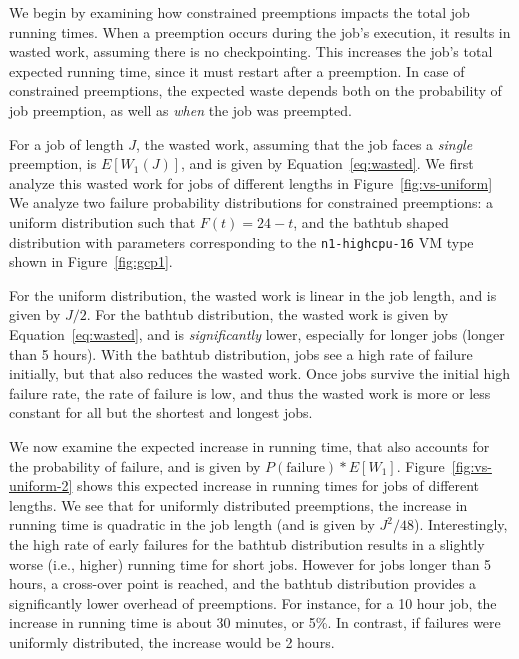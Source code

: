 
We begin by examining how constrained preemptions impacts the total job running times. 
When a preemption occurs during the job's execution, it results in wasted work, assuming there is no checkpointing. 
This increases the job's total expected running time, since it must restart after a preemption.
In case of constrained preemptions, the expected waste depends both on the probability of job preemption, as well as \emph{when} the job was preempted. 


For a job of length $J$, the wasted work, assuming that the job faces a \emph{single} preemption, is $E[W_1(J)]$, and is given by Equation~\ref{eq:wasted}.
We first analyze this wasted work for jobs of different lengths in Figure~\ref{fig:vs-uniform}
We analyze two failure probability distributions for constrained preemptions: a uniform distribution such that $F(t) = 24-t$, and the bathtub shaped distribution with parameters corresponding to the \texttt{n1-highcpu-16} VM type shown in Figure~\ref{fig:gcp1}. 


For the uniform distribution, the wasted work is linear in the job length, and is given by $J/2$.
For the bathtub distribution, the wasted work is given by Equation~\ref{eq:wasted}, and is \emph{significantly} lower, especially for longer jobs (longer than 5 hours). 
With the bathtub distribution, jobs see a high rate of failure initially, but that also reduces the wasted work. 
Once jobs survive the initial high failure rate, the rate of failure is low, and thus the wasted work is more or less constant for all but the shortest and longest jobs. 



We now examine the expected increase in running time, that also accounts for the probability of failure, and is given by $P(\text{failure})*E[W_1]$. 
Figure~\ref{fig:vs-uniform-2} shows this expected increase in running times for jobs of different lengths.
We see that for uniformly distributed preemptions, the increase in running time is quadratic in the job length (and is given by $J^2/48$).
Interestingly, the high rate of early failures for the bathtub distribution results in a slightly worse (i.e., higher) running time for short jobs.
However for jobs longer than 5 hours, a cross-over point is reached, and the bathtub distribution provides a significantly lower overhead of preemptions. 
For instance, for a 10 hour job, the increase in running time is about 30 minutes, or 5\%. 
In contrast, if failures were uniformly distributed, the increase would be 2 hours. 


